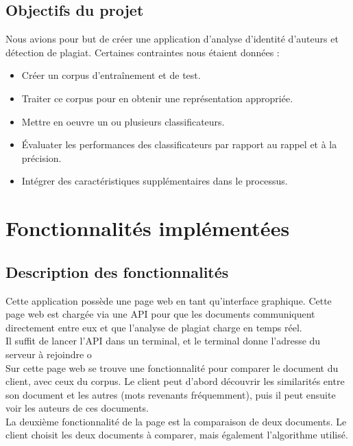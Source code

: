 \documentclass[french,12pt]{article}
\begin{document}
\subsection{Objectifs du projet} \label{objectifs}

Nous avions pour but de créer une application d'analyse d’identité d’auteurs et détection de plagiat. Certaines contraintes nous étaient données :
\begin{itemize}
	\item Créer un corpus d'entraînement et de test.
	\item Traiter ce corpus pour en obtenir une représentation appropriée.
	\item Mettre en oeuvre un ou plusieurs classificateurs.
	\item Évaluater les performances des classificateurs par rapport au
	rappel et à la précision.
	\item Intégrer des caractéristiques supplémentaires dans le processus.
\end{itemize}

\section{Fonctionnalités implémentées} \label{organisation}

\subsection{Description des fonctionnalités}

Cette application possède une page web en tant qu'interface graphique. Cette page web est chargée via une API pour que les documents communiquent directement entre eux et que l'analyse de plagiat charge en temps réel.\\

Il suffit de lancer l'API dans un terminal, et le terminal donne l'adresse du serveur à rejoindre o\\

Sur cette page web se trouve une fonctionnalité pour comparer le document du client, avec ceux du corpus. Le client peut d'abord découvrir les similarités entre son document et les autres (mots revenants fréquemment), puis il peut ensuite voir les auteurs de ces documents.\\

La deuxième fonctionnalité  de la page est la comparaison de deux documents. Le client choisit les deux documents à comparer, mais également l'algorithme utilisé.
\end{document}
